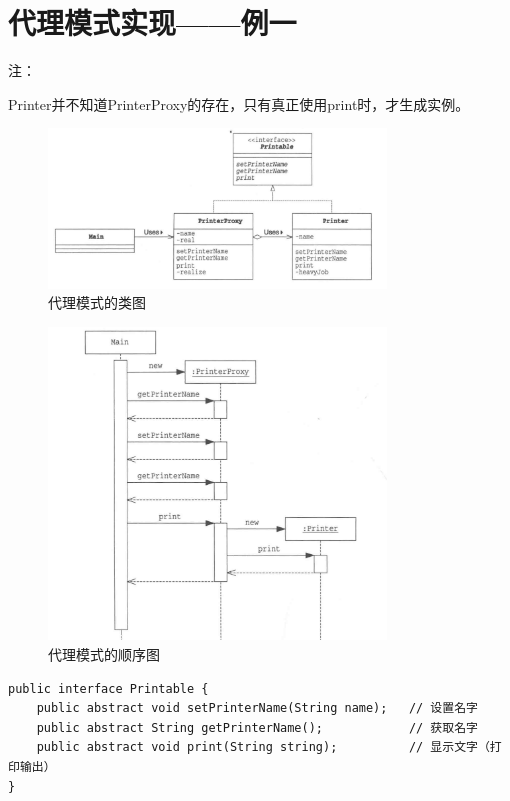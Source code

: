 \section{代理模式实现——例一}
注：
\par Printer并不知道PrinterProxy的存在，只有真正使用print时，才生成实例。
\begin{figure}[!h]
	\centering
	\includegraphics[width=0.8\textwidth]{image/21-1}
	\caption{代理模式的类图}
\end{figure}
\begin{figure}[!h]
	\centering
	\includegraphics[width=0.8\textwidth]{image/21-2}
	\caption{代理模式的顺序图}
\end{figure}
\begin{lstlisting}
public interface Printable {
	public abstract void setPrinterName(String name);   // 设置名字
	public abstract String getPrinterName();            // 获取名字
	public abstract void print(String string);          // 显示文字（打印输出）
}
\end{lstlisting}
